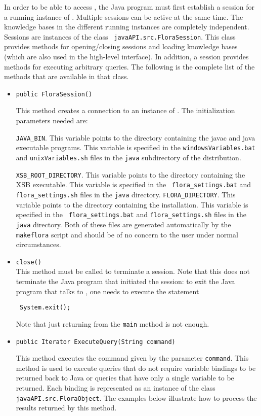 In order to be able to access \FLORA, the Java program must first establish
a session for a running instance of \FLORA. Multiple sessions can be active
at the same time. The knowledge bases in the different running instances
are completely independent. Sessions are instances of
the class {\tt
javaAPI.src.FloraSession}. This class provides methods
for opening/closing sessions and loading \FLORA knowledge bases
(which are also used in the high-level
interface). In addition, a session provides 
methods for executing arbitrary \FLORA queries. The following is the complete
list of the methods that are available in that class.
\begin{itemize}
\item
\begin{verbatim}
public FloraSession()
\end{verbatim}
    This method creates a connection to an instance of \FLORA.
The initialization parameters needed are:

{\tt JAVA\_BIN}. This variable points to the directory containing
the javac and java executable programs. This variable is specified in
the {\tt windowsVariables.bat} and  {\tt unixVariables.sh}  files in the
{\tt java} subdirectory of the \FLORA distribution.

{\tt XSB\_ROOT\_DIRECTORY}. This variable points to the directory
containing the XSB executable. This variable is specified in the {\tt
  flora\_settings.bat} and {\tt flora\_settings.sh} files in the {\tt java}
directory.  {\tt FLORA\_DIRECTORY}. This variable points to the directory
containing the \FLORA installation. This variable is specified in the {\tt
  flora\_settings.bat} and {\tt flora\_settings.sh} files in the {\tt java}
directory.  Both of these files are generated automatically by the {\tt
  makeflora} script and should be of no concern to the user under normal
circumstances.
\item {\tt close()} \\
  This method must be called to terminate a \FLORA session. Note that this does
  not terminate the Java program that initiated the session:
  to exit the Java program that talks to \FLORA, one needs to execute
  the statement
\begin{verbatim}
 System.exit();  
\end{verbatim}
  Note that just returning from the {\tt main} method is not enough. 

\item
\begin{verbatim}
public Iterator ExecuteQuery(String command)
\end{verbatim}
    This method executes the \FLORA command given by the
parameter {\tt command}.  This method is used to execute \FLORA queries that
do not require variable bindings to be returned back to Java or queries that
have only
a single variable to be returned. Each binding is represented as
an instance of the class {\tt javaAPI.src.FloraObject}.
The examples below illustrate how to process the results returned by this
method.


\end{itemize}
